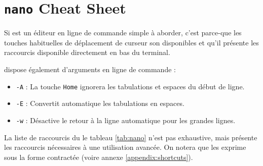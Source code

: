 \section{\texttt{nano} Cheat Sheet} \label{appendix:nano} 
\vspace{-7mm}
Si  est un éditeur en ligne de commande simple à aborder, c'est parce-que les touches habituelles de déplacement de curseur son disponibles et qu'il présente les raccourcis disponible directement en bas du terminal.

 dispose également d'arguments en ligne de commande :
\begin{itemize}
    \item \texttt{-A} : La touche \texttt{Home} ignorera les tabulations et espaces du début de ligne.
    \item \texttt{-E} : Convertit automatique les tabulations en espaces.
    \item \texttt{-w} : Désactive le retour à la ligne automatique pour les grandes lignes.
\end{itemize}
\vspace{2mm}
La liste de raccourcis du le tableau \ref{tab:nano} n'est pas exhaustive, mais présente les raccourcis nécessaires à une utilisation avancée. On notera que  les exprime sous la forme contractée (voire annexe \ref{appendix:shortcuts}).

